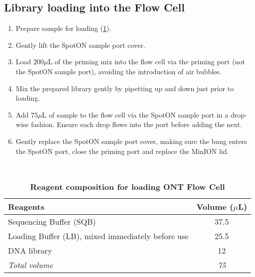\subsection{Library loading into the Flow Cell}
\begin{enumerate}
	\item Prepare sample for loading (\cref{tab:ont_loading_flow_cells}).
	\item Gently lift the SpotON sample port cover.
	\item Load 200$\mu$L of the priming mix into the flow cell via the priming port (not the SpotON sample port), avoiding the introduction of air bubbles.
	\item Mix the prepared library gently by pipetting up and down just prior to loading.
	\item Add 75$\mu$L of sample to the flow cell via the SpotON sample port in a drop-wise fashion. Ensure each drop flows into the port before adding the next.
	\item Gently replace the SpotON sample port cover, making sure the bung enters the SpotON port, close the priming port and replace the MinION lid.
\end{enumerate}
\

\begin{table}[h]
	\centering
	\caption[Loading ONT Flow Cell]%
	{\textbf{Reagent composition for loading ONT Flow Cell}}
	\label{tab:ont_loading_flow_cells}
	\begin{tabularx}{0.8\textwidth}{lc}
		\toprule
		Reagents                                          & Volume ($\mu$L) \\ \midrule
		Sequencing Buffer (SQB)                           & 37.5        \\
		Loading Buffer (LB), mixed immediately before use & 25.5        \\
		DNA library                                       & 12          \\
		\textit{Total volume}                                             & \textit{75}          \\ \bottomrule
	\end{tabularx}
\end{table}
\resumetocwriting